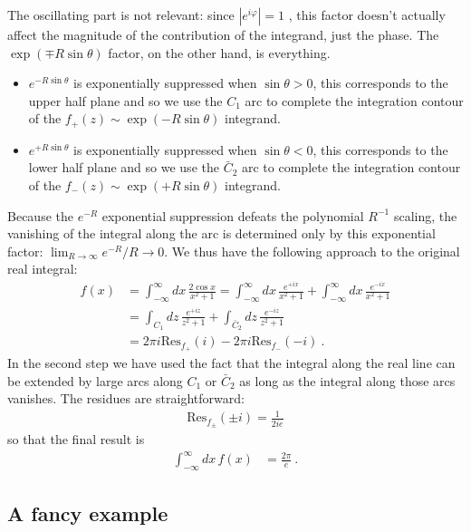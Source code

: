 The oscillating part is not relevant: since $|e^{i\varphi}| = 1$ , this factor doesn't actually affect the magnitude of the contribution of the integrand, just the phase. The $\exp(\mp R\sin\theta)$ factor, on the other hand, is everything. 
\begin{itemize}
	\item $e^{- R\sin\theta}$ is exponentially suppressed when $\sin\theta > 0$, this corresponds to the upper half plane and so we use the $C_1$ arc to complete the integration contour of the $f_+(z)\sim \exp(-R\sin\theta)$ integrand.
	\item $e^{+ R\sin\theta}$ is exponentially suppressed when $\sin\theta < 0$, this corresponds to the lower half plane and so we use the $\bar C_2$ arc to complete the integration contour of the $f_-(z)\sim \exp(+R\sin\theta)$ integrand.
\end{itemize}
Because the $e^{-R}$ exponential suppression defeats the polynomial $R^{-1}$ scaling, the vanishing of the integral along the arc is determined only by this exponential factor: $\lim_{R\to\infty}e^{-R}/R\to 0$. We thus have the following approach to the original real integral:
\begin{align}
f(x) &= \int_{-\infty}^\infty  dx\,
\frac{2\cos x}{x^2+1} 
	= 
	\int_{-\infty}^\infty  dx\,
	\frac{e^{+ix}}{x^2+1} 
	+
	\int_{-\infty}^\infty  dx\,
	\frac{e^{-ix}}{x^2+1} 
	\\ 
	&=
	\int_{C_1} dz\, 
	\frac{e^{+iz}}{z^2+1} 
	+
	\int_{\bar C_2} dz\, 
	\frac{e^{-iz}}{z^2+1} 
	\\
	&=
	2\pi i \text{Res}_{f_+}(i)
	-
	2\pi i \text{Res}_{f_-}(-i)
\ .
\end{align}
In the second step we have used the fact that the integral along the real line can be extended by large arcs along $C_1$ or $\bar C_2$ as long as the integral along those arcs vanishes. The residues are straightforward: 
\begin{align}
	\text{Res}_{f_\pm}(\pm i) = \frac{1}{2ie}
\end{align}
so that the final result is
\begin{align}
	\int_{-\infty}^\infty dx\, f(x) &= \frac{2\pi}{e} \ .
\end{align}


 \subsection{A fancy example}

